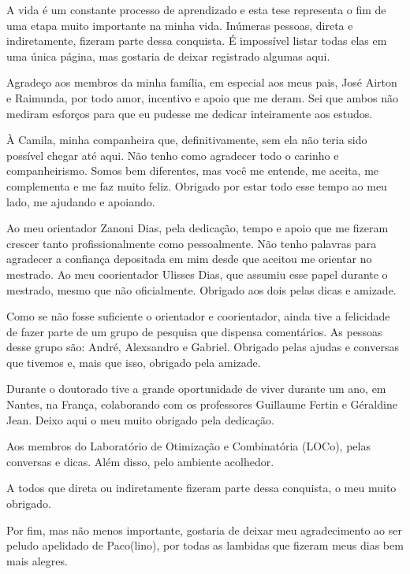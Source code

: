\documentclass[Portugues]{ic-tese-v3}
\theoremstyle{definition}
\theoremstyle{remark}
\theoremstyle{definition}
\begin{document}

A vida é um constante processo de aprendizado e esta tese representa o fim de uma etapa muito importante na minha vida. Inúmeras pessoas, direta e indiretamente, fizeram parte dessa conquista. É impossível listar todas elas em uma única página, mas gostaria de deixar registrado algumas aqui. 

Agradeço aos membros da minha família, em especial aos meus pais, José Airton e Raimunda, por todo amor, incentivo e apoio que me deram. Sei que ambos não mediram esforços para que eu pudesse me dedicar inteiramente aos estudos. 

À Camila, minha companheira que, definitivamente, sem ela não teria sido possível chegar até aqui. Não tenho como agradecer todo o carinho e companheirismo. Somos bem diferentes, mas você me entende, me aceita, me complementa e me faz muito feliz. Obrigado por estar todo esse tempo ao meu lado, me ajudando e apoiando.  

Ao meu orientador Zanoni Dias, pela dedicação, tempo e apoio que me fizeram crescer tanto profissionalmente como pessoalmente. Não tenho palavras para agradecer a confiança depositada em mim desde que aceitou me orientar no mestrado. Ao meu coorientador Ulisses Dias, que assumiu esse papel durante o mestrado, mesmo que não oficialmente. Obrigado aos dois pelas dicas e amizade.

Como se não fosse suficiente o orientador e coorientador, ainda tive a felicidade de fazer parte de um grupo de pesquisa que dispensa comentários. As pessoas desse grupo são: André, Alexsandro e Gabriel. Obrigado pelas ajudas e conversas que tivemos e, mais que isso, obrigado pela amizade.

Durante o doutorado tive a grande oportunidade de viver durante um ano, em Nantes, na França, colaborando com os professores Guillaume Fertin e Géraldine Jean. Deixo aqui o meu muito obrigado pela dedicação.

Aos membros do Laboratório de Otimização e Combinatória (LOCo), pelas conversas e dicas. Além disso, pelo ambiente acolhedor.

A todos que direta ou indiretamente fizeram parte dessa conquista, o meu muito obrigado.

Por fim, mas não menos importante, gostaria de deixar meu agradecimento ao ser peludo apelidado de Paco(lino), por todas as lambidas que fizeram meus dias bem mais alegres.
\end{document}
